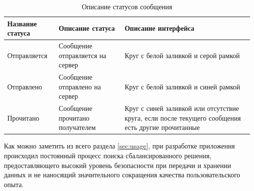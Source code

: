 \begin{table}[!ht]
  \caption{Описание статусов сообщения}
  \label{table:usage:dialogues:statusdesc}
  \centering
  \begin{tabularx}{\linewidth}{
    |>{\centering\hsize=0.75\hsize}X|
    >{\centering\hsize=1\hsize}X|
    >{\centering\arraybackslash\hsize=1.25\hsize}X|
  }
	\hline
	Название статуса & Описание статуса & Описание интерфейса \\

	\hline
	Отправляется & Сообщение отправляется на сервер & Круг с белой заливкой и серой рамкой \\

	\hline
	Отправлено & Сообщение отправлено на сервер & Круг с белой заливкой и синей рамкой \\

	\hline
	Прочитано & Сообщение прочитано получателем & Круг с синей заливкой или отсутствие круга, если после текущего сообщения есть другие прочитанные \\

	\hline
  \end{tabularx}
\end{table}

Как можно заметить из всего раздела \ref{sec:usage}, при разработке приложения происходил постоянный процесс поиска сбалансированного решения, предоставляющего высокий уровень безопасности при передачи и хранении данных и не наносящий значительного сокращения качества пользовательского опыта.